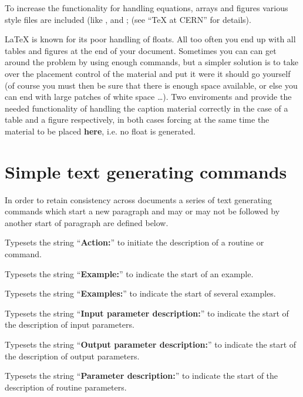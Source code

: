 To increase the functionality for handling equations, arrays and figures
various style files are included 
(like ,  and ;
(see ``\TeX{} at CERN''\cite{bib-TAC} for details).

\LaTeX{} is known for its poor handling of floats. 
All too often you end up with all tables and figures at the
end of your document. 
Sometimes you can can get around the problem by using enough 
 commands, but a simpler solution is
to take over the placement control of the material and put it
were it should go yourself (of course you must then
be sure that there is enough space available, or else 
you can end with large patches of white space \ldots).
Two enviroments  and  provide the needed
functionality of handling the caption material correctly in the 
case of a table and a figure respectively, in both cases forcing
at the same time the material to be placed {\bf here}, i.e. no
float is generated.

\section{Simple text generating commands}

In order to retain consistency across documents a series
of text generating commands which start a new paragraph 
and may or may not be followed by another start of paragraph
are defined below. 


Typesets the string ``\textbf{Action:}'' to initiate
the description of a routine or command.

\newpage %

Typesets the string ``\textbf{Example:}'' to indicate the start of an example.

Typesets the string ``\textbf{Examples:}'' to indicate the start of several examples.

Typesets the string ``\textbf{Input parameter description:}''
to indicate the start of the description of input parameters.

Typesets the string ``\textbf{Output parameter description:}''
to indicate the start of the description of output parameters.

Typesets the string ``\textbf{Parameter description:}''
to indicate the start of the description of routine parameters.

